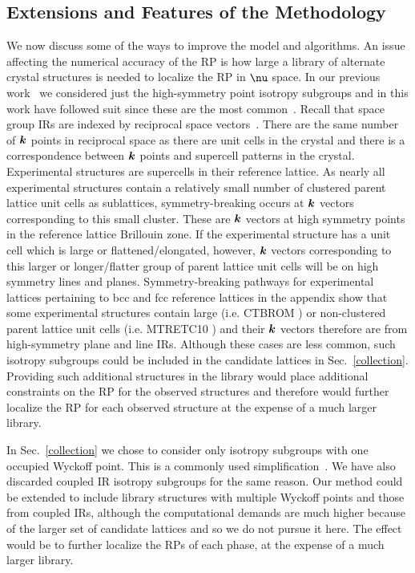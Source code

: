 \documentclass[preprint]{iucr}              %
\newcommand{\mb}[1]{\ensuremath{\mbox{\boldmath $ #1 $}}}
\begin{document}
\subsection{Extensions and Features of the Methodology}
\label{extensions}

We now discuss some of the ways to improve the model and algorithms.
An issue affecting the numerical accuracy of the RP is how large a
library of alternate crystal structures is needed to localize the RP
in $\mb{\nu}$ space. In our previous work~\cite{Mettes04} we
considered just the high-symmetry point isotropy subgroups and in
this work have followed suit since these are the most
common~\cite{Stokes88}. Recall that space group IRs are indexed by
reciprocal space vectors~\cite{Kovalev93,Zak69}. There are the same
number of $\mb{k}$ points in reciprocal space as there are unit
cells in the crystal and there is a correspondence between $\mb{k}$
points and supercell patterns in the crystal. Experimental
structures are supercells in their reference lattice. As nearly all
experimental structures contain a relatively small number of
clustered parent lattice unit cells as sublattices,
symmetry-breaking occurs at $\mb{k}$ vectors corresponding to this
small cluster.  These are $\mb{k}$ vectors at high symmetry points
in the reference lattice Brillouin zone. If the experimental
structure has a unit cell which is large or flattened/elongated,
however, $\mb{k}$ vectors corresponding to this larger or
longer/flatter group of parent lattice unit cells will be on high
symmetry lines and planes. Symmetry-breaking pathways for experimental lattices
pertaining to bcc and fcc reference lattices in the appendix show that some
experimental structures contain
large (i.e. CTBROM \cite{More77}) or non-clustered parent lattice unit cells
(i.e. MTRETC10 \cite{Harrison72}) and their $\mb{k}$ vectors therefore are from
high-symmetry
plane and line IRs. Although these cases are less common, such
isotropy subgroups could be included in the candidate lattices in
Sec.~\ref{collection}. Providing such additional structures in the
library would place additional constraints on the RP for the
observed structures and therefore would further localize the RP for each
observed structure at the expense of a much larger library.

In Sec.~\ref{collection} we chose to consider only isotropy
subgroups with one occupied Wyckoff point. This is a commonly used
simplification~\cite{Verwer98}. We have also discarded coupled IR
isotropy subgroups for the same reason. Our method could be extended
to include library structures with multiple Wyckoff points and those
from coupled IRs, although the computational demands are much higher
because of the larger set of candidate lattices and so we do not
pursue it here. The effect would be to further localize the RPs of
each phase, at the expense of a much larger library.
\end{document}
